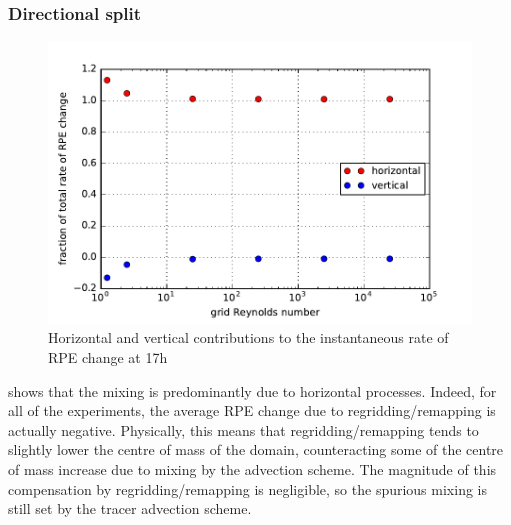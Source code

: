 \subsubsection{Directional split}
\begin{figure}
  \includegraphics{../plots/lock_exchange_drpe_split.pdf}
  \caption{\label{fig:lock-rpesplit} Horizontal and vertical contributions to the instantaneous rate of RPE change at 17h}
\end{figure}

 shows that the mixing is predominantly due to horizontal processes. Indeed, for all of the experiments, the average RPE change due to regridding/remapping is actually negative. Physically, this means that regridding/remapping tends to slightly lower the centre of mass of the domain, counteracting some of the centre of mass increase due to mixing by the advection scheme. The magnitude of this compensation by regridding/remapping is negligible, so the spurious mixing is still set by the tracer advection scheme.

